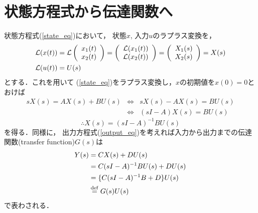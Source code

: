 \section{状態方程式から伝達関数へ}
状態方程式(\ref{state_eq})において，
状態$x$, 入力$u$のラプラス変換を，
\begin{align}
 {\cal L}(x(t)) &=
 {\cal L} \left(
        \begin{array}{c}
	 x_1(t) \\
	 x_2(t)
	\end{array}
	\right) = 
 \left(
 \begin{array}{c}
  {\cal L}(x_1(t)) \\
  {\cal L}(x_2(t))
 \end{array}
 \right) = 
 \left(
 \begin{array}{c}
  X_1(s) \\
  X_2(s)
 \end{array}
 \right) = X(s) \\
 {\cal L}(u(t)) &= U(s)
\end{align}
とする．これを用いて
(\ref{state_eq})をラプラス変換し，$x$の初期値を$x(0) = 0$とおけば
\begin{eqnarray*}
 s X(s) = A X(s) + B U(s) & \Leftrightarrow & s X(s) - A X(s) = B U(s) \\
                          & \Leftrightarrow & (sI - A)X(s) = B U(s)
\end{eqnarray*}
\begin{equation}
 \therefore X(s) = (s I - A)^{-1} B U(s)
\end{equation}
を得る．同様に，
出力方程式(\ref{output_eq})を考えれば入力から出力までの伝達関数(transfer function)$G(s)$は
\begin{align}
 Y(s) &= C X(s) + D U(s) \nonumber \\
      &= C (s I - A)^{-1} B U(s) + D U(s) \nonumber \\
      &= \{ C ( s I - A )^{-1} B + D \} U(s) \\
      &\stackrel{\rm def}{=} G(s) U(s)
\end{align}
で表わされる．


